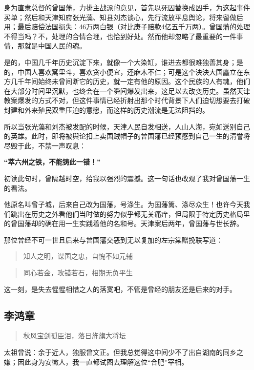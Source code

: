 \documentclass[]{book}
\begin{document}
身为直隶总督的曾国藩，力排主战派的意见，首先以死囚替换成凶手，为这起事件买单；然后和天津知府张光藻、知县刘杰谈心，先行流放平息舆论，将来留做后用；最后赔偿法国损失：46万两白银（对比庚子赔款4亿五千万两）。曾国藩的处理不得当吗？不，处理的合情合理，也恰到好处。然而他却忽略了最重要的一件事情，那就是中国人民的魂。

是的，中国几千年历史沉淀下来，就像一个大染缸，谁进去都很难独善其身；是的，中国人喜欢窝里斗，喜欢贪小便宜，还麻木不仁；可是这个泱泱大国矗立在东方几千年间始终未曾间断它的历史，就一定有他的原因。这个民族的人有魂，他们在大部分时间里沉默，也终会在一个瞬间爆发出来，这足以去改变历史。虽然天津教案爆发的方式不对，但这件事情已经折射出那个时代背景下人们迫切想要去打破封建和外来殖民双重压迫的意愿，而这样的历史潮流是无法阻挡的。

所以当张光藻和刘杰被发配的时候，天津人民自发相送，人山人海，宛如送别自己的英雄。此时，即将被舆论扣上卖国贼帽子的曾国藩已经预感到自己一生的清誉将尽毁于此，不禁一声叹息：

\textbf{``萃六州之铁，不能铸此一错！''}

初读此句时，曾隔越时空，给我以强烈的震撼。这一句话也改观了我对曾国藩一生的看法。

他原名叫曾子城，后来自己改为国藩，号涤生。为国藩篱、涤尽众生！也许今天我们跳出在历史之外看他们当时做的努力似乎都无关痛痒，但局限于特定历史格局里的曾国藩却的确在用一生实践着他的名和号。天津案后两年，曾国藩与世长辞。

那位曾经不可一世且后来与曾国藩交恶到无以复加的左宗棠赠挽联写道：

\begin{quote}
知人之明，谋国之忠，自愧不如元辅
\end{quote}

\begin{quote}
同心若金，攻错若石，相期无负平生
\end{quote}

这一刻，是失去惺惺相惜之人的落寞吧，不管是曾经的朋友还是后来的对手。

\subsection{李鸿章}

\begin{quote}
秋风宝剑孤臣泪，落日旌旗大将坛
\end{quote}

太祖曾说：余于近人，独服曾文正。但我总觉得这中间少不了出自湖南的同乡之嫌；因此身为安徽人，我一直都试图去理解这位``合肥''宰相。
\end{document}
